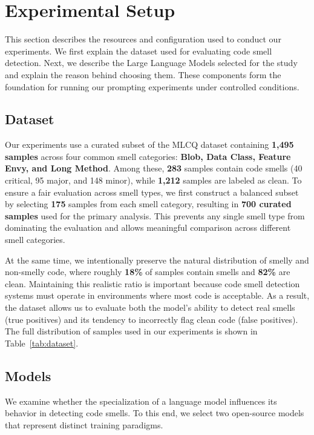 \documentclass[sigconf,review,anonymous]{acmart}
\begin{document}
\section{Experimental Setup}

This section describes the resources and configuration used to conduct our experiments. 
We first explain the dataset used for evaluating code smell detection. 
Next, we describe the Large Language Models selected for the study and explain the reason behind choosing them. 
These components form the foundation for running our prompting experiments under controlled conditions.

\subsection{Dataset}

Our experiments use a curated subset of the MLCQ dataset \cite{mlcq} containing \textbf{1,495 samples} across four common smell categories: \textbf{Blob, Data Class, Feature Envy, and Long Method}. Among these, \textbf{283} samples contain code smells (40 critical, 95 major, and 148 minor), while \textbf{1,212} samples are labeled as clean. To ensure a fair evaluation across smell types, we first construct a balanced subset by selecting \textbf{175} samples from each smell category, resulting in \textbf{700 curated samples} used for the primary analysis. This prevents any single smell type from dominating the evaluation and allows meaningful comparison across different smell categories.

At the same time, we intentionally preserve the natural distribution of smelly and non-smelly code, where roughly \textbf{18\%} of samples contain smells and \textbf{82\%} are clean. Maintaining this realistic ratio is important because code smell detection systems must operate in environments where most code is acceptable. As a result, the dataset allows us to evaluate both the model’s ability to detect real smells (true positives) and its tendency to incorrectly flag clean code (false positives). The full distribution of samples used in our experiments is shown in Table~\ref{tab:dataset}.


\subsection{Models}

We examine whether the specialization of a language model influences its behavior in detecting code smells. To this end, we select two open-source models that represent distinct training paradigms.
\end{document}
